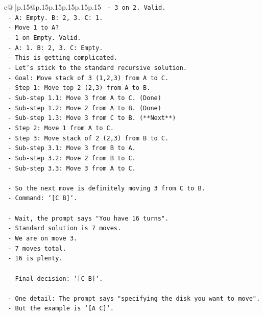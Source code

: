 \documentclass{article}
\begin{document}
{\begin{supertabular}{c@{$\;$}|p{.15\linewidth}@{}p{.15\linewidth}p{.15\linewidth}p{.15\linewidth}p{.15\linewidth}p{.15\linewidth}}
{{{\texttt{    {-} 3 on 2. Valid.} \\
\texttt{    {-} A: Empty. B: 2, 3. C: 1.} \\
\texttt{    {-} Move 1 to A?} \\
\texttt{    {-} 1 on Empty. Valid.} \\
\texttt{    {-} A: 1. B: 2, 3. C: Empty.} \\
\texttt{    {-} This is getting complicated.} \\
\texttt{  {-} Let's stick to the standard recursive solution.} \\
\texttt{  {-} Goal: Move stack of 3 (1,2,3) from A to C.} \\
\texttt{  {-} Step 1: Move top 2 (2,3) from A to B.} \\
\texttt{    {-} Sub{-}step 1.1: Move 3 from A to C. (Done)} \\
\texttt{    {-} Sub{-}step 1.2: Move 2 from A to B. (Done)} \\
\texttt{    {-} Sub{-}step 1.3: Move 3 from C to B. (**Next**)} \\
\texttt{  {-} Step 2: Move 1 from A to C.} \\
\texttt{  {-} Step 3: Move stack of 2 (2,3) from B to C.} \\
\texttt{    {-} Sub{-}step 3.1: Move 3 from B to A.} \\
\texttt{    {-} Sub{-}step 3.2: Move 2 from B to C.} \\
\texttt{    {-} Sub{-}step 3.3: Move 3 from A to C.} \\
\\ 
\texttt{  {-} So the next move is definitely moving 3 from C to B.} \\
\texttt{  {-} Command: `{[}C B{]}`.} \\
\\ 
\texttt{  {-} Wait, the prompt says "You have 16 turns".} \\
\texttt{  {-} Standard solution is 7 moves.} \\
\texttt{  {-} We are on move 3.} \\
\texttt{  {-} 7 moves total.} \\
\texttt{  {-} 16 is plenty.} \\
\\ 
\texttt{  {-} Final decision: `{[}C B{]}`.} \\
\\ 
\texttt{  {-} One detail: The prompt says "specifying the disk you want to move".} \\
\texttt{  {-} But the example is `{[}A C{]}`.} \\
}}}
\end{supertabular}}
\end{document}
